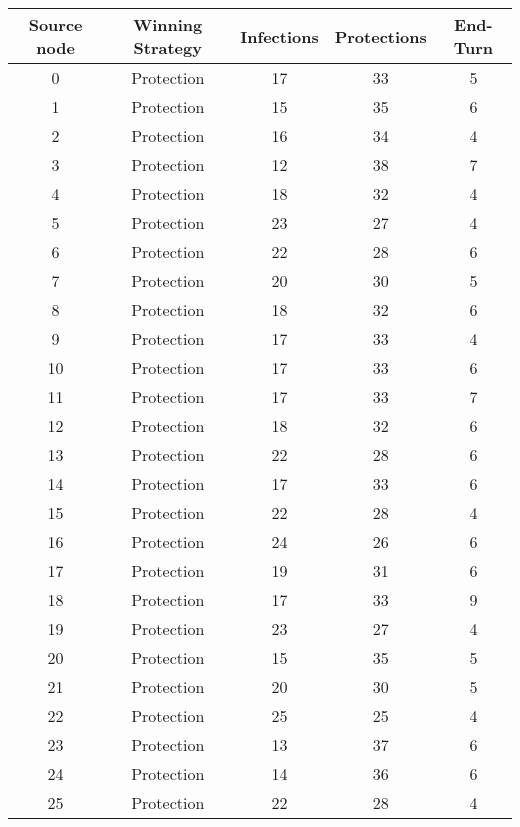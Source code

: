\documentclass[results.tex]{subfiles}
\begin{document}
\begin{center}
  \begin{tabular}{| c || c | c | c | c |}
    \hline
    {\bfseries Source node} & {\bfseries Winning Strategy} & {\bfseries Infections} & {\bfseries Protections} & {\bfseries End-Turn} \\  %
    \hline\hline
    0 & Protection & 17 & 33 & 5 \\ 
    \hline
    1 & Protection & 15 & 35 & 6 \\ 
    \hline
    2 & Protection & 16 & 34 & 4 \\ 
    \hline
    3 & Protection & 12 & 38 & 7 \\ 
    \hline
    4 & Protection & 18 & 32 & 4 \\ 
    \hline
    5 & Protection & 23 & 27 & 4 \\ 
    \hline
    6 & Protection & 22 & 28 & 6 \\ 
    \hline
    7 & Protection & 20 & 30 & 5 \\ 
    \hline
    8 & Protection & 18 & 32 & 6 \\ 
    \hline
    9 & Protection & 17 & 33 & 4 \\ 
    \hline
    10 & Protection & 17 & 33 & 6 \\ 
    \hline
    11 & Protection & 17 & 33 & 7 \\ 
    \hline
    12 & Protection & 18 & 32 & 6 \\ 
    \hline
    13 & Protection & 22 & 28 & 6 \\ 
    \hline
    14 & Protection & 17 & 33 & 6 \\ 
    \hline
    15 & Protection & 22 & 28 & 4 \\ 
    \hline
    16 & Protection & 24 & 26 & 6 \\ 
    \hline
    17 & Protection & 19 & 31 & 6 \\ 
    \hline
    18 & Protection & 17 & 33 & 9 \\ 
    \hline
    19 & Protection & 23 & 27 & 4 \\ 
    \hline
    20 & Protection & 15 & 35 & 5 \\ 
    \hline
    21 & Protection & 20 & 30 & 5 \\ 
    \hline
    22 & Protection & 25 & 25 & 4 \\ 
    \hline
    23 & Protection & 13 & 37 & 6 \\ 
    \hline
    24 & Protection & 14 & 36 & 6 \\ 
    \hline
    25 & Protection & 22 & 28 & 4 \\ 

\end{tabular}
\end{center}
\end{document}

